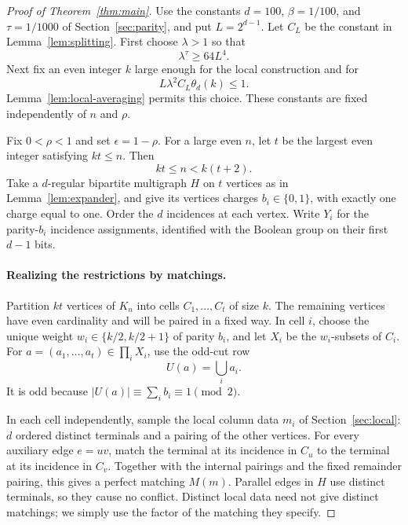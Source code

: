 \begin{proof}[Proof of Theorem~\ref{thm:main}]
Use the constants $d=100$, $\beta=1/100$, and $\tau=1/1000$ of
Section~\ref{sec:parity}, and put $L=2^{d-1}$.  Let $C_L$ be the
constant in Lemma~\ref{lem:splitting}.  First choose $\lambda>1$
so that
\begin{equation}\label{eq:matching-lambda}
 \lambda^\tau\ge64L^4.
\end{equation}
Next fix an even integer $k$ large enough for the local construction
and for
\begin{equation}\label{eq:matching-local-smallness}
 L\lambda^2C_L\theta_d(k)\le1.
\end{equation}
Lemma~\ref{lem:local-averaging} permits this choice.  These constants
are fixed independently of $n$ and $\rho$.

Fix $0<\rho<1$ and set $\epsilon=1-\rho$.  For a large even $n$,
let $t$ be the largest even integer satisfying $kt\le n$.  Then
\begin{equation}\label{eq:matching-size}
 kt\le n<k(t+2).
\end{equation}
Take a $d$-regular bipartite multigraph $H$ on $t$ vertices as in
Lemma~\ref{lem:expander}, and give its vertices charges $b_i\in\{0,1\}$,
with exactly one charge equal to one.  Order the $d$ incidences at
each vertex.  Write $Y_i$ for the parity-$b_i$ incidence assignments,
identified with the Boolean group on their first $d-1$ bits.

\paragraph{Realizing the restrictions by matchings.}
Partition $kt$ vertices of $K_n$ into cells $C_1,\ldots,C_t$ of
size $k$.  The remaining vertices have even cardinality and will
be paired in a fixed way.  In cell $i$, choose the unique weight
$w_i\in\{k/2,k/2+1\}$ of parity $b_i$, and let $X_i$ be the
$w_i$-subsets of $C_i$.  For $a=(a_1,\ldots,a_t)\in\prod_iX_i$,
use the odd-cut row
\[
 U(a)=\bigcup_i a_i.
\]
It is odd because $|U(a)|\equiv\sum_i b_i\equiv1\pmod2$.

In each cell independently, sample the local column data $m_i$
of Section~\ref{sec:local}: $d$ ordered distinct terminals and a
pairing of the other vertices.  For every auxiliary edge $e=uv$,
match the terminal at its incidence in $C_u$ to the terminal at
its incidence in $C_v$.  Together with the internal pairings and
the fixed remainder pairing, this gives a perfect matching $M(m)$.
Parallel edges in $H$ use distinct terminals, so they cause no
conflict.  Distinct local data need not give distinct matchings;
we simply use the factor of the matching they specify.


\end{proof}
